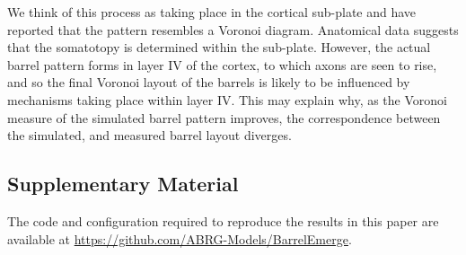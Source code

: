 \documentclass[9pt,twocolumn,twoside,lineno]{pnas-new}
\begin{document}
We think of this process as taking place in the cortical sub-plate and have
reported that the pattern resembles a Voronoi diagram. Anatomical data
suggests that the somatotopy is determined within the sub-plate. However, the
actual barrel pattern forms in layer IV of the cortex, to which axons are seen
to rise, and so the final Voronoi layout of the barrels is likely to be
influenced by mechanisms taking place within layer IV. This may explain why,
as the Voronoi measure of the simulated barrel pattern improves, the
correspondence between the simulated, and measured barrel layout diverges.


\subsection*{Supplementary Material}

The code and configuration required to reproduce the results in this paper are
available at \url{https://github.com/ABRG-Models/BarrelEmerge}.


\end{document}

